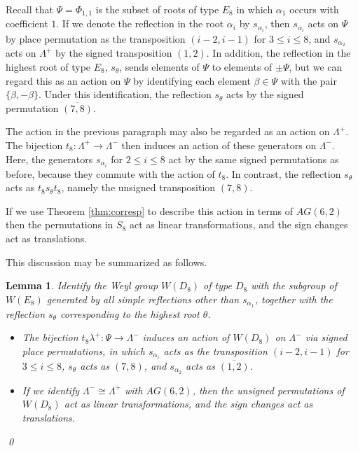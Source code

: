 \documentclass{amsart}
\theoremstyle{plain}
\newtheorem{lemma}[theorem]{Lemma}
\theoremstyle{definition}
\theoremstyle{remark}
\numberwithin{equation}{section}
\newcommand{\al}{\alpha}
\newcommand{\be}{\beta}
\newcommand{\ra}{\rightarrow}
\newcommand{\allroots}{\Phi}
\newcommand{\lamp}{\Lambda^+}
\newcommand{\slp}{\lambda^+}
\newcommand{\lamm}{\Lambda^-}
\begin{document}
Recall that $\Psi = \allroots_{1, 1}$ is the subset of roots of type $E_8$ in which $\al_1$ occurs with coefficient 
$1$. If we denote the reflection in the root $\al_i$ by $s_{\al_i}$, then $s_{\al_i}$ acts on $\Psi$ by place 
permutation as the transposition $(i-2, i-1)$ for $3 \leq i \leq 8$, and $s_{\al_2}$ acts on $\lamp$ by the signed
transposition $\overline{(1, 2)}$. In addition, the reflection in the highest root of type $E_8$, $s_\theta$,
sends elements of $\Psi$ to elements of $\pm \Psi$, but we can regard this as an action on $\Psi$ by identifying
each element $\be \in \Psi$ with the pair $\{\be, -\be\}$. Under this identification, the reflection $s_\theta$ acts
by the signed permutation $\overline{(7, 8)}$.

The action in the previous paragraph may also be regarded as an action on $\lamp$. The bijection 
$t_8 : \lamp \ra \lamm$ then induces an action of these generators on $\lamm$. Here, the generators $s_{\al_i}$ for
$2 \leq i \leq 8$ act by the same signed permutations as before, because they commute with the action of
$t_8$. In contrast, the reflection $s_\theta$ acts as $t_8 s_\theta t_8$, namely the unsigned transposition
$(7, 8)$. 

If we use Theorem \ref{thm:corresp} to describe this action in terms of $AG(6, 2)$ then the permutations
in $S_8$ act as linear transformations, and the sign changes act as translations.

This discussion may be summarized as follows.

\begin{lemma}\label{lem:d8act}
Identify the Weyl group $W(D_8)$ of type $D_8$ with the subgroup of $W(E_8)$ generated by all simple reflections
other than $s_{\al_1}$, together with the reflection $s_\theta$ corresponding to the highest root $\theta$.
\begin{itemize}
\item[{\rm (i)}]{The bijection 
$t_8 \slp : \Psi \ra \lamm$ induces an action of $W(D_8)$ on $\lamm$ via signed place permutations, in which
$s_{\al_i}$ acts as the transposition $(i-2, i-1)$ for $3 \leq i \leq 8$, $s_\theta$ acts as $(7, 8)$, and $s_{\al_2}$ 
acts as $\overline{(1, 2)}$.}
\item[{\rm (ii)}]{If we identify $\lamm \cong \lamp$ with $AG(6, 2)$, then the unsigned permutations of $W(D_8)$
act as linear transformations, and the sign changes act as translations.}
\end{itemize}\qed\end{lemma}  
\end{document}
